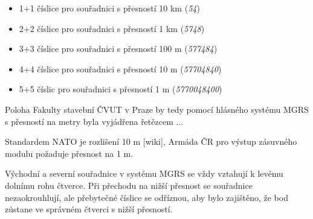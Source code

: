\begin{itemize}
		\begin{itemize}
				\item 1+1 číslice pro souřadnici s přesností 10 km (\textit{54})
				\item 2+2 číslice pro souřadnici s přesností 1 km (\textit{5748})
				\item 3+3 číslice pro souřadnici s přesností 100 m (\textit{577484})
				\item 4+4 číslice pro souřadnici s přesností 10 m (\textit{57704840})
				\item 5+5 číslic pro souřadnici s přesností 1 m (\textit{5770048400})
		\end{itemize}	
		 
\end{itemize}

Poloha Fakulty stavební ČVUT v Praze by tedy pomocí hlásného systému MGRS s přesností na metry byla vyjádřena řetězcem ...

Standardem NATO je rozlišení 10 m [wiki], Armáda ČR pro výstup zásuvného modulu požaduje přesnost na 1 m.

Východní a severní souřadnice v systému MGRS se vždy vztahují k levému dolnímu rohu čtverce. Při přechodu na nižší přesnost se souřadnice nezaokrouhlují, ale přebytečné číslice se odříznou, aby bylo zajištěno, že bod zůstane ve správném čtverci s nižší přesností.




